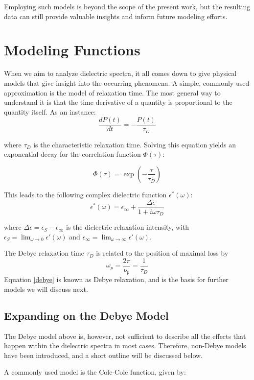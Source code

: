 Employing such models is beyond the scope of the present work, but the resulting data can still provide valuable insights and inform future modeling efforts.
\section{Modeling Functions}

When we aim to analyze dielectric spectra, it all comes down to give physical models that give insight into the occurring phenomena. A simple, commonly-used approximation is the model of relaxation time. The most general way to understand it is that the time derivative of a quantity is proportional to the quantity itself. As an instance:
\[
\frac{dP(t)}{dt} = -\frac{P(t)}{\tau_D}
\]

where \( \tau_D \) is the characteristic relaxation time. Solving this equation yields an exponential decay for the correlation function \( \Phi(\tau) \):

\[
\Phi(\tau) = \exp\left(-\frac{\tau}{\tau_D}\right)
\]

This leads to the following complex dielectric function \( \epsilon^*(\omega) \):
\begin{equation}
\label{debye}
\epsilon^*(\omega) = \epsilon_\infty + \frac{\Delta \epsilon}{1 + i \omega \tau_D}
\end{equation}

where \( \Delta \epsilon = \epsilon_S - \epsilon_\infty \) is the dielectric relaxation intensity, with \( \epsilon_S = \lim_{\omega \to 0} \epsilon'(\omega) \) and \( \epsilon_\infty = \lim_{\omega \to \infty} \epsilon'(\omega) \).

The Debye relaxation time \( \tau_D \) is related to the position of maximal loss by
\begin{equation}
\omega_p = \frac{2\pi}{\nu_p} = \frac{1}{\tau_D}
\label{relaxation_freq_relation}
\end{equation}
Equation \ref{debye} is known as Debye relaxation, and is the basis for further models we will discuss next.
\subsection{Expanding on the Debye Model}
The Debye model above is, however, not sufficient to describe all the effects that happen within the dielectric spectra in most cases. Therefore, non-Debye models have been introduced, and a short outline will be discussed below.

A commonly used model is the Cole-Cole function, given by:

